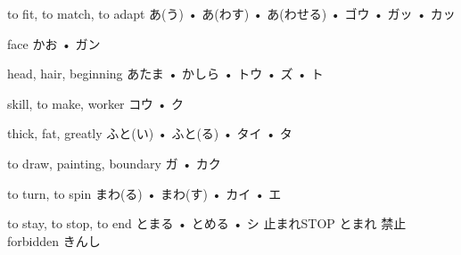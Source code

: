 



\setcounter{cardnum}{113}

		{to fit, to match, to adapt}
		{あ(う) • あ(わす) • あ(わせる) • ゴウ • ガッ • カッ}
		{}{}
		{}{}
		{}{}
		{}{}
		{}{}

		{face}
		{かお • ガン}
		{}{}
		{}{}
		{}{}
		{}{}
		{}{}

		{head, hair, beginning}
		{あたま • かしら • トウ • ズ • ト}
		{}{}
		{}{}
		{}{}
		{}{}
		{}{}

		{skill, to make, worker}
		{コウ • ク}
		{}{}
		{}{}
		{}{}
		{}{}
		{}{}

		{thick, fat, greatly}
		{ふと(い) • ふと(る) • タイ • タ}
		{}{}
		{}{}
		{}{}
		{}{}
		{}{}

		{to draw, painting, boundary}
		{ガ • カク}
		{}{}
		{}{}
		{}{}
		{}{}
		{}{}

		{to turn, to spin}
		{まわ(る) • まわ(す) • カイ • エ}
		{}{}
		{}{}
		{}{}
		{}{}
		{}{}

		{to stay, to stop, to end}
		{とまる • とめる • シ}
		{止まれ}{STOP とまれ}
		{禁止}{forbidden きんし}
		{}{}
		{}{}
		{}{}

